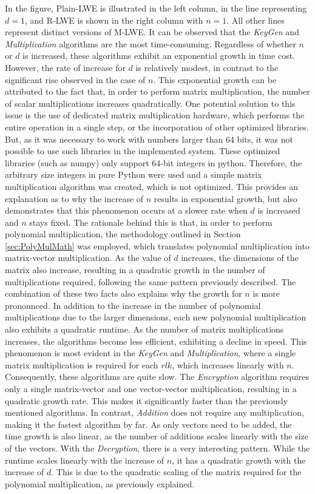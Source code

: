 In the figure, Plain-LWE is illustrated in the left column, in the line representing $d=1$, and R-LWE is shown in the right column with $n=1$. All other lines represent distinct versions of M-LWE. It can be observed that the \textit{KeyGen} and \textit{Multiplication} algorithms are the most time-consuming. Regardless of whether $n$ or $d$ is increased, these algorithms exhibit an exponential growth in time cost. However, the rate of increase for $d$ is relatively modest, in contrast to the significant rise observed in the case of $n$. This exponential growth can be attributed to the fact that, in order to perform matrix multiplication, the number of scalar multiplications increases quadratically. One potential solution to this issue is the use of dedicated matrix multiplication hardware, which performs the entire operation in a single step, or the incorporation of other optimized libraries. But, as it was necessary to work with numbers larger than 64 bits, it was not possible to use such libraries in the implemented system. These optimized libraries (such as numpy) only support 64-bit integers in python. Therefore, the arbitrary size integers in pure Python were used and a simple matrix multiplication algorithm was created, which is not optimized. This provides an explanation as to why the increase of $n$ results in exponential growth, but also demonstrates that this phenomenon occurs at a slower rate when $d$ is increased and $n$ stays fixed. The rationale behind this is that, in order to perform polynomial multiplication, the methodology outlined in Section \ref{sec:PolyMulMath} was employed, which translates polynomial multiplication into matrix-vector multiplication. As the value of $d$ increases, the dimensions of the matrix also increase, resulting in a quadratic growth in the number of multiplications required, following the same pattern previously described. The combination of these two facts also explains why the growth for $n$ is more pronounced. In addition to the increase in the number of polynomial multiplications due to the larger dimensions, each new polynomial multiplication also exhibits a quadratic runtime.
As the number of matrix multiplications increases, the algorithms become less efficient, exhibiting a decline in speed. This phenomenon is most evident in the \textit{KeyGen} and \textit{Multiplication}, where a single matrix multiplication is required for each $rlk$, which increases linearly with $n$. Consequently, these algorithms are quite slow. The \textit{Encryption} algorithm requires only a single matrix-vector and one vector-vector multiplication, resulting in a quadratic growth rate. This makes it significantly faster than the previously mentioned algorithms. In contrast, \textit{Addition} does not require any multiplication, making it the fastest algorithm by far. As only vectors need to be added, the time growth is also linear, as the number of additions scales linearly with the size of the vectors. With the \textit{Decryption}, there is a very interesting pattern. While the runtime scales linearly with the increase of $n$, it has a quadratic growth with the increase of $d$. This is due to the quadratic scaling of the matrix required for the polynomial multiplication, as previously explained. \\
